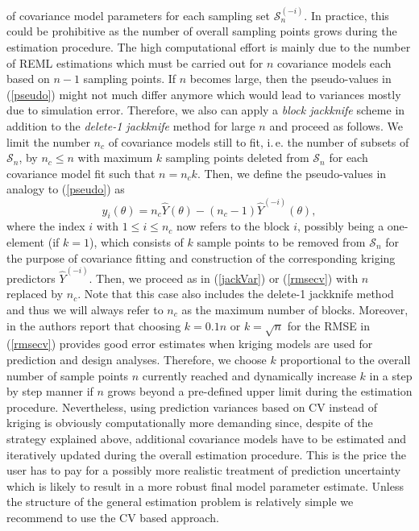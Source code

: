 \documentclass[article, nojss]{jss}
\numberwithin{equation}{section}			%
\newcommand{\Sample}{\mathcal{S}}
\begin{document}
of covariance model parameters for each sampling set $\Sample_n^{(-i)}$.
In practice, this could be prohibitive as the number of overall sampling points
grows during the estimation procedure. The high computational effort is mainly due
to the number of REML estimations which must be carried out for $n$ covariance
models each based on $n-1$ sampling points. If $n$ becomes large, then the
pseudo-values in (\ref{pseudo}) might not much differ anymore which would lead to variances
mostly due to simulation error. Therefore, we also can apply a \emph{block
jackknife} scheme \citep[see, e.\,g.][and references therein]{Shao1995} in
addition to the \emph{delete-1 jackknife} method for large $n$ and proceed as
follows. We limit the number $n_c$ of covariance models still to fit,
i.\,e. the number of subsets of $\Sample_n$, by $n_c\leq n$ with maximum $k$ sampling points
deleted from $\Sample_n$ for each covariance model fit such that $n=n_ck$.
Then, we define the pseudo-values in analogy to (\ref{pseudo}) as
\begin{equation}\label{pseudonc}
 \hat{y}_{i}(\theta) = n_c\hat{Y}(\theta)-(n_c-1)\hat{Y}^{(-i)}(\theta),
\end{equation}
where the index $i$ with $1\leq i\leq n_c$ now refers to the block $i$, possibly
being a one-element (if $k=1$), which consists of $k$ sample points to be
removed from $\Sample_n$ for the purpose of covariance fitting and construction of the
corresponding kriging predictors $\hat{Y}^{(-i)}$. Then, we proceed as in
(\ref{jackVar}) or (\ref{rmsecv}) with $n$ replaced by $n_c$. Note that this case also
includes the delete-1 jackknife method and thus we will always refer to $n_c$ as
the maximum number of blocks. Moreover, in \citet{Meckesheimer2002} the
authors report that choosing $k=0.1n$ or $k=\sqrt{n}$ for the RMSE in (\ref{rmsecv}) provides good error
estimates when kriging models are used for prediction and design analyses.
Therefore, we choose $k$ proportional to the overall number of sample points $n$
currently reached and dynamically increase $k$ in a step by step manner if $n$ grows beyond
a pre-defined upper limit during the estimation procedure. Nevertheless, using
prediction variances based on CV instead of kriging is obviously computationally more demanding
since, despite of the strategy explained above, additional covariance models have to be estimated
and iteratively updated during the overall estimation procedure. This is the
price the user has to pay for a possibly more realistic treatment of prediction uncertainty which
is likely to result in a more robust final model parameter estimate. Unless the
structure of the general estimation problem is relatively simple we recommend to use the CV based approach.
%
\end{document}
